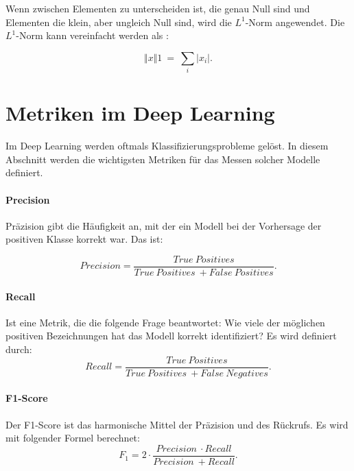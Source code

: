         Wenn zwischen Elementen zu unterscheiden ist, die genau Null sind und Elementen die klein, aber ungleich Null sind, wird die $L^1$-Norm angewendet. Die $L^1$-Norm kann vereinfacht werden als \cite*[40]{IanGoodfellowYoshuaBengio2016}:

        \begin{equation} \label{FormelNorm1}
            \Vert x\Vert 1\ =\ \sum _{i}\bigr| x_{i}\bigr|.
        \end{equation}

\section{Metriken im Deep Learning}
Im Deep Learning werden oftmals Klassifizierungsprobleme gelöst. In diesem Abschnitt werden die wichtigsten Metriken für das Messen solcher Modelle definiert.
\paragraph{Precision}
Präzision gibt die Häufigkeit an, mit der ein Modell bei der Vorhersage der positiven Klasse korrekt war. Das ist:

\begin{equation} \label{Preci}
             Precision =  \frac{True\ Positives}{True\ Positives\ + False\ Positives}.
        \end{equation}
\paragraph{Recall}
Ist eine Metrik, die die folgende Frage beantwortet: Wie viele der möglichen positiven Bezeichnungen hat das Modell korrekt identifiziert? Es wird definiert durch:
\begin{equation} \label{Recall}
             Recall =  \frac{True\ Positives}{True\ Positives\ + False\ Negatives}.
        \end{equation}


\paragraph{F1-Score}
Der F1-Score ist das harmonische Mittel der Präzision und des Rückrufs. Es wird mit folgender Formel berechnet:
\begin{equation} \label{F1Score}
             F_1 =  2 \cdot \frac{Precision\ \cdot Recall}{Precision\  + Recall}.
        \end{equation}
        
